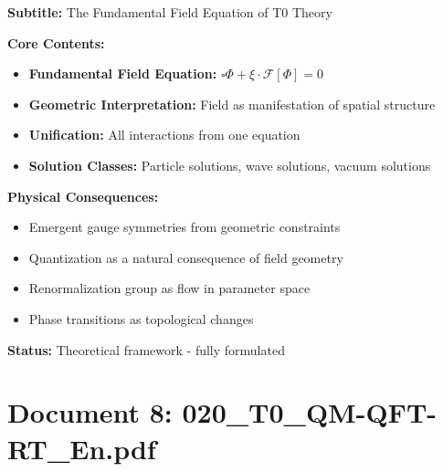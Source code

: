 	\begin{documentbox}
		\textbf{Subtitle:} The Fundamental Field Equation of T0 Theory
		
		\textbf{Core Contents:}
		\begin{itemize}
			\item \textbf{Fundamental Field Equation:} $\square \Phi + \xi \cdot \mathcal{F}[\Phi] = 0$
			\item \textbf{Geometric Interpretation:} Field as manifestation of spatial structure
			\item \textbf{Unification:} All interactions from one equation
			\item \textbf{Solution Classes:} Particle solutions, wave solutions, vacuum solutions
		\end{itemize}
		
		\textbf{Physical Consequences:}
		\begin{itemize}
			\item Emergent gauge symmetries from geometric constraints
			\item Quantization as a natural consequence of field geometry
			\item Renormalization group as flow in parameter space
			\item Phase transitions as topological changes
		\end{itemize}
		
		\textbf{Status:} Theoretical framework - fully formulated
	\end{documentbox}
	
	\section{Document 8: 020\_T0\_QM-QFT-RT\_En.pdf}
	
